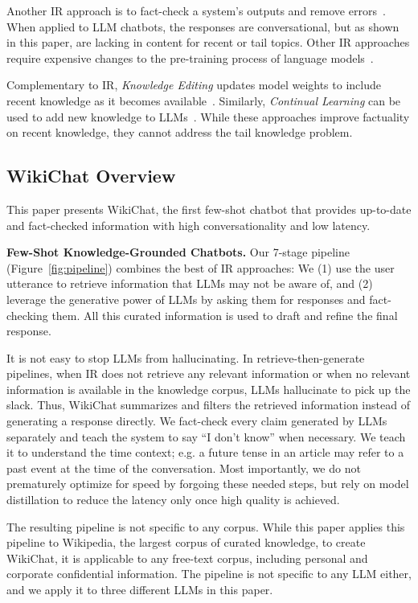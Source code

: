 \documentclass[11pt]{article}
\newcommand{\system}[0]{WikiChat\xspace}
\begin{document}
Another IR approach is to fact-check a system's outputs and remove errors~\cite{gao-etal-2023-rarr, jiang2023active}.
When applied to LLM chatbots, the responses are conversational, but as shown in this paper, are lacking in content for recent or tail topics.  Other IR approaches require expensive changes to the pre-training process of language models~\cite{lewis2020retrieval, realm2020}.

Complementary to IR, \emph{Knowledge Editing} updates model weights to include recent knowledge as it becomes available~\cite{de-cao-etal-2021-editing, meng2022locating, mitchell2022memory}.
Similarly, \emph{Continual Learning} can be used to add new knowledge to LLMs~\cite{jang-etal-2022-temporalwiki}. While these approaches improve factuality on recent knowledge, they cannot address the tail knowledge problem. 

\subsection{\system Overview}
\label{sec:overview}
This paper presents \system, the first few-shot chatbot that provides up-to-date and fact-checked information with high conversationality and low latency. 

{\bf Few-Shot Knowledge-Grounded Chatbots.}
Our 7-stage pipeline (Figure~\ref{fig:pipeline}) combines the best of IR approaches: We (1) use the user utterance to retrieve information that LLMs may not be aware of, and (2) leverage the generative power of LLMs by asking them for responses and fact-checking them. All this curated information is used to draft and refine the final response.

It is not easy to stop LLMs from hallucinating.
In retrieve-then-generate pipelines, when IR does not retrieve any relevant information or when no relevant information is available in the knowledge corpus, LLMs hallucinate to pick up the slack. Thus, \system summarizes and filters the retrieved information instead of generating a response directly. We fact-check every claim generated by LLMs separately and teach the system to say ``I don't know'' when necessary. We teach it to understand the time context; e.g. a future tense in an article may refer to a past event at the time of the conversation. Most importantly, we do not prematurely optimize for speed by forgoing these needed steps, but rely on model distillation to reduce the latency only once high quality is achieved.

The resulting pipeline is not specific to any corpus. While this paper applies this pipeline to Wikipedia, the largest corpus of curated knowledge, to create \system, it is applicable to any free-text corpus, including personal and corporate confidential information. The pipeline is not specific to any LLM either, and we apply it to three different LLMs in this paper.
\end{document}
